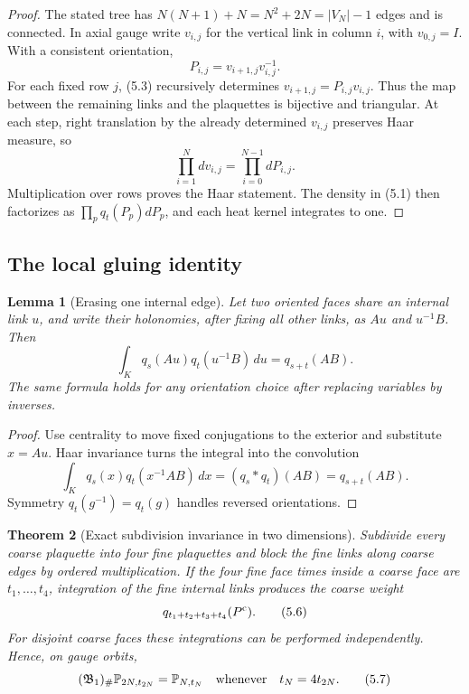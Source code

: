 \documentclass[11pt]{article}
\newtheorem{theorem}{Theorem}[section]
\newtheorem{lemma}[theorem]{Lemma}
\theoremstyle{remark}
\begin{document}
\begin{proof}
The stated tree has \(N(N+1)+N=N^2+2N=|V_N|-1\) edges and is connected.
In axial gauge write \(v_{i,j}\) for the vertical link in column \(i\),
with \(v_{0,j}=I\).  With a consistent orientation,
\[
 P_{i,j}=v_{i+1,j}v_{i,j}^{-1}.                            \tag{5.3}
\]
For each fixed row \(j\), (5.3) recursively determines
\(v_{i+1,j}=P_{i,j}v_{i,j}\).  Thus the map between the remaining links and
the plaquettes is bijective and triangular.  At each step, right
translation by the already determined \(v_{i,j}\) preserves Haar measure,
so
\[
 \prod_{i=1}^N dv_{i,j}=\prod_{i=0}^{N-1}dP_{i,j}.         \tag{5.4}
\]
Multiplication over rows proves the Haar statement.  The density in (5.1)
then factorizes as \(\prod_pq_t(P_p)dP_p\), and each heat kernel integrates
to one.
\end{proof}

\subsection{The local gluing identity}

\begin{lemma}[Erasing one internal edge]
\label{lem:v19v2-gluing}
Let two oriented faces share an internal link \(u\), and write their
holonomies, after fixing all other links, as \(Au\) and \(u^{-1}B\).
Then
\[
 \int_K q_s(Au)q_t(u^{-1}B)\,du=q_{s+t}(AB).               \tag{5.5}
\]
The same formula holds for any orientation choice after replacing variables
by inverses.
\end{lemma}

\begin{proof}
Use centrality to move fixed conjugations to the exterior and substitute
\(x=Au\).  Haar invariance turns the integral into the convolution
\[
 \int_K q_s(x)q_t(x^{-1}AB)\,dx=(q_s*q_t)(AB)
 =q_{s+t}(AB).
\]
Symmetry \(q_t(g^{-1})=q_t(g)\) handles reversed orientations.
\end{proof}

\begin{theorem}[Exact subdivision invariance in two dimensions]
\label{thm:v19v2-subdivision}
Subdivide every coarse plaquette into four fine plaquettes and block the
fine links along coarse edges by ordered multiplication.  If the four fine
face times inside a coarse face are \(t_1,\ldots,t_4\), integration of the
fine internal links produces the coarse weight
\[
 q_{t_1+t_2+t_3+t_4}(P^{\rm c}).                           \tag{5.6}
\]
For disjoint coarse faces these integrations can be performed independently.
Hence, on gauge orbits,
\[
 (\mathfrak B_1)_\#{\mathbb P}_{2N,t_{2N}}
 ={\mathbb P}_{N,t_N}
 \quad\hbox{whenever}\quad t_N=4t_{2N}.                    \tag{5.7}
\]
\end{theorem}
\end{document}
